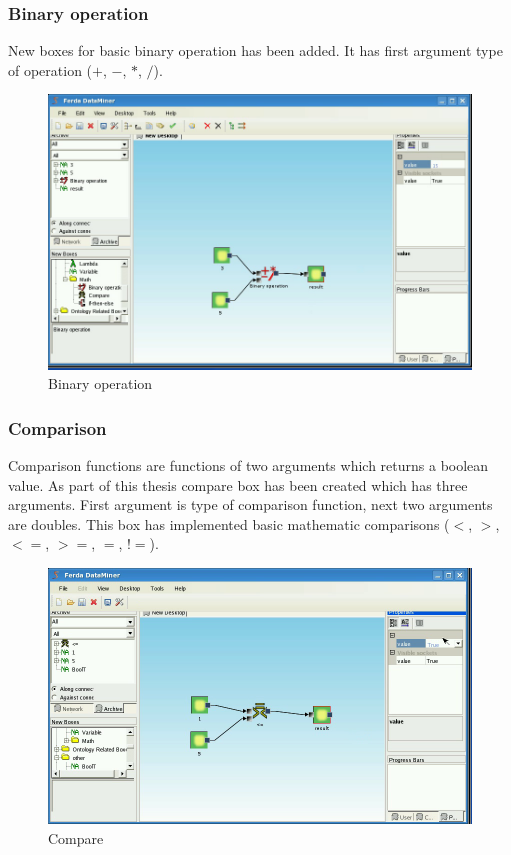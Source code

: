 \documentclass[a4paper,12pt]{book}
\begin{document}
\subsubsection{Binary operation}
New boxes for basic binary operation has been added. It has first argument type of operation ($+$, $-$, $*$, $/$).
\begin{figure}
	\includegraphics[width=12cm]{binaryOperation2.png}
	\caption{Binary operation}
\end{figure}

\subsubsection{Comparison}
Comparison functions are functions of two arguments which returns a boolean value. As part of this thesis compare box has been created which has three arguments. First argument is type of comparison function, next two arguments are doubles. This box has implemented basic mathematic comparisons ($<$, $>$, $<=$, $>=$, $=$, $!=$).
\begin{figure}
\includegraphics[width=12cm]{compare2.png}
	\caption{Compare}
\end{figure}
\end{document}
